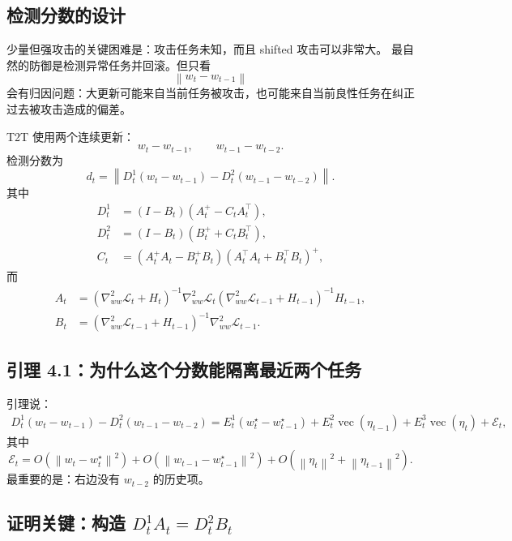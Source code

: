 \documentclass[UTF8,fontset=none,11pt]{ctexart}
\theoremstyle{cnstyle}
\newcommand{\vect}{\operatorname{vec}}
\newcommand{\calL}{\mathcal{L}}
\newcommand{\norm}[1]{\left\lVert #1\right\rVert}
\begin{document}
\subsection{检测分数的设计}

少量但强攻击的关键困难是：攻击任务未知，而且 shifted 攻击可以非常大。
最自然的防御是检测异常任务并回滚。但只看
\[
  \norm{w_t-w_{t-1}}
\]
会有归因问题：大更新可能来自当前任务被攻击，也可能来自当前良性任务在纠正过去被攻击造成的偏差。

T2T 使用两个连续更新：
\[
  w_t-w_{t-1},\qquad w_{t-1}-w_{t-2}.
\]
检测分数为
\begin{equation}
  d_t=
  \norm{
  D_t^1(w_t-w_{t-1})-D_t^2(w_{t-1}-w_{t-2})
  }.
  \label{eq:dt}
\end{equation}
其中
\begin{align}
  D_t^1&=(I-B_t)(A_t^+-C_tA_t^\top),\\
  D_t^2&=(I-B_t)(B_t^++C_tB_t^\top),\\
  C_t&=(A_t^+A_t-B_t^+B_t)(A_t^\top A_t+B_t^\top B_t)^+,
  \label{eq:Dt}
\end{align}
而
\begin{align}
  A_t&=(\nabla_{ww}^2\calL_t+H_t)^{-1}
      \nabla_{ww}^2\calL_t
      (\nabla_{ww}^2\calL_{t-1}+H_{t-1})^{-1}H_{t-1},\\
  B_t&=(\nabla_{ww}^2\calL_{t-1}+H_{t-1})^{-1}
      \nabla_{ww}^2\calL_{t-1}.
\end{align}

\subsection{引理 4.1：为什么这个分数能隔离最近两个任务}

引理说：
\begin{align}
  D_t^1(w_t-w_{t-1})-D_t^2(w_{t-1}-w_{t-2})
  =
  E_t^1(w_t^\star-w_{t-1}^\star)
  +E_t^2\vect(\eta_{t-1})
  +E_t^3\vect(\eta_t)
  +\mathcal E_t,
  \label{eq:t2t-lemma}
\end{align}
其中
\[
  \mathcal E_t
  =
  O(\norm{w_t-w_t^\star}^2)
  +O(\norm{w_{t-1}-w_{t-1}^\star}^2)
  +O(\norm{\eta_t}^2+\norm{\eta_{t-1}}^2).
\]
最重要的是：右边没有 \(w_{t-2}\) 的历史项。

\subsection{证明关键：构造 \(D_t^1A_t=D_t^2B_t\)}
\end{document}
